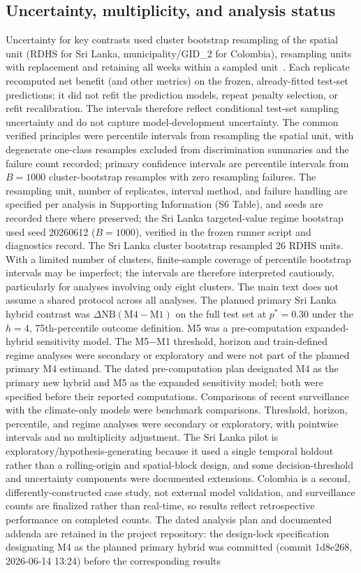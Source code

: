 \documentclass[11pt,a4paper]{article}
\begin{document}
\subsection{Uncertainty, multiplicity, and analysis status}
Uncertainty for key contrasts used cluster bootstrap resampling of the spatial unit (RDHS for Sri Lanka, municipality/GID\_2 for Colombia), resampling units with replacement and retaining all weeks within a sampled unit~\cite{CameronGelbachMiller2008}. Each replicate recomputed net benefit (and other metrics) on the frozen, already-fitted test-set predictions; it did not refit the prediction models, repeat penalty selection, or refit recalibration. The intervals therefore reflect conditional test-set sampling uncertainty and do not capture model-development uncertainty. The common verified principles were percentile intervals from resampling the spatial unit, with degenerate one-class resamples excluded from discrimination summaries and the failure count recorded; primary confidence intervals are percentile intervals from $B=1000$ cluster-bootstrap resamples with zero resampling failures. The resampling unit, number of replicates, interval method, and failure handling are specified per analysis in Supporting Information (S6 Table), and seeds are recorded there where preserved; the Sri Lanka targeted-value regime bootstrap used seed 20260612 ($B=1000$), verified in the frozen runner script and diagnostics record. The Sri Lanka cluster bootstrap resampled 26 RDHS units. With a limited number of clusters, finite-sample coverage of percentile bootstrap intervals may be imperfect; the intervals are therefore interpreted cautiously, particularly for analyses involving only eight clusters. The main text does not assume a shared protocol across all analyses. The planned primary Sri Lanka hybrid contrast was $\Delta\mathrm{NB}(\text{M4}-\text{M1})$ on the full test set at $p^*=0.30$ under the $h=4$, 75th-percentile outcome definition. M5 was a pre-computation expanded-hybrid sensitivity model. The M5$-$M1 threshold, horizon and train-defined regime analyses were secondary or exploratory and were not part of the planned primary M4 estimand. The dated pre-computation plan designated M4 as the primary new hybrid and M5 as the expanded sensitivity model; both were specified before their reported computations. Comparisons of recent surveillance with the climate-only models were benchmark comparisons. Threshold, horizon, percentile, and regime analyses were secondary or exploratory, with pointwise intervals and no multiplicity adjustment. The Sri Lanka pilot is exploratory/hypothesis-generating because it used a single temporal holdout rather than a rolling-origin and spatial-block design, and some decision-threshold and uncertainty components were documented extensions. Colombia is a second, differently-constructed case study, not external model validation, and surveillance counts are finalized rather than real-time, so results reflect retrospective performance on completed counts. The dated analysis plan and documented addenda are retained in the project repository: the design-lock specification designating M4 as the planned primary hybrid was committed (commit 1d8e268, 2026-06-14 13:24) before the corresponding results 
\end{document}
